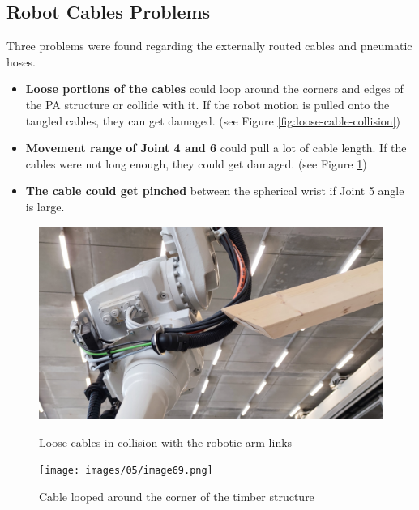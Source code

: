 \subsection{Robot Cables Problems}
\label{subsection:exploration-2-robot-cables-problems}

Three problems were found regarding the externally routed cables and pneumatic hoses. 

\begin{itemize}
    \item \textbf{Loose portions of the cables} could loop around the corners and edges of the PA structure or collide with it. If the robot motion is pulled onto the tangled cables, they can get damaged. (see Figure \ref{fig:loose-cable-collision})
    \item \textbf{Movement range of Joint 4 and 6} could pull a lot of cable length. If the cables were not long enough, they could get damaged. (see Figure \ref{fig:looped-cable-collision})
    \item \textbf{The cable could get pinched} between the spherical wrist if Joint 5 angle is large.
\end{itemize}

\begin{figure}[!h]
    \centering
    \begin{minipage}{0.49\textwidth}
        \centering
        \includegraphics[width=\textwidth]{images/05/image88.jpg}
        \caption{Loose cables in collision with the robotic arm links}
        \label{fig:loose-cable-collision}
    \end{minipage}
    \hfill
    \begin{minipage}{0.49\textwidth}
        \centering
        \texttt{[image: images/05/image69.png]}
        \caption{Cable looped around the corner of the timber structure}
        \label{fig:looped-cable-collision}
    \end{minipage}
\end{figure}

